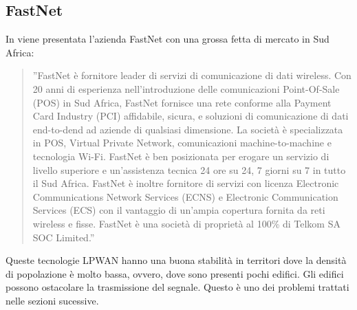 \documentclass[a4paper]{report} %
\begin{document}
\subsection{FastNet}
In \cite{art:rif.26} viene presentata l'azienda FastNet con una grossa fetta di mercato in Sud Africa:
\begin{quote}
	''FastNet è fornitore leader di servizi di comunicazione di dati wireless. Con 20 anni di esperienza nell'introduzione delle comunicazioni Point-Of-Sale (POS) in Sud Africa, FastNet fornisce una rete conforme alla Payment Card Industry (PCI) affidabile, sicura, e soluzioni di comunicazione di dati end-to-dend ad aziende di qualsiasi dimensione. La società è specializzata in POS, Virtual Private Network, comunicazioni machine-to-machine e tecnologia Wi-Fi.
	FastNet è ben posizionata per erogare un servizio di livello superiore e un'assistenza tecnica 24 ore su 24, 7 giorni su 7 in tutto il Sud Africa. FastNet è inoltre fornitore di servizi con licenza Electronic Communications Network Services (ECNS) e Electronic Communication Services (ECS) con il vantaggio di un'ampia copertura fornita da reti wireless e fisse.
	FastNet è una società di proprietà al 100\% di Telkom SA SOC Limited.''
\end{quote}
Queste tecnologie LPWAN hanno una buona stabilità in territori dove la densità di popolazione è molto bassa, ovvero, dove sono presenti pochi edifici. Gli edifici possono ostacolare la trasmissione del segnale. Questo è uno dei problemi trattati nelle sezioni sucessive.
\end{document}
